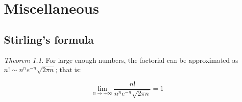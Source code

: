 \documentclass[12pt,a4paper]{report}
\numberwithin{equation}{section}
\theoremstyle{definition}
\theoremstyle{remark}
\newtheorem{theorem}{Theorem}[section]
\begin{document}
\chapter{Miscellaneous}

\section{Stirling's formula}

\begin{theorem}
For large enough numbers, the factorial can be approximated as $n! \sim n^n e^{-n} \sqrt{2\pi n}$; that is:

\begin{equation}
\lim_{n\rightarrow +\infty} \frac{n!}{n^n e^{-n} \sqrt{2\pi n}} = 1
\end{equation}
\end{theorem}
\end{document}
